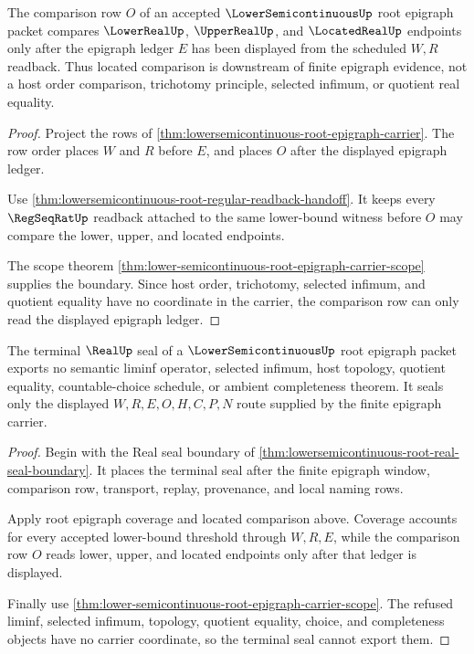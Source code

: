 \begin{theorem}
\label{thm:lowersemicontinuous-root-located-comparison}
The comparison row $O$ of an accepted $\LowerSemicontinuousUp$ root epigraph packet compares $\LowerRealUp$, $\UpperRealUp$, and $\LocatedRealUp$ endpoints only after the epigraph ledger $E$ has been displayed from the scheduled $W,R$ readback. Thus located comparison is downstream of finite epigraph evidence, not a host order comparison, trichotomy principle, selected infimum, or quotient real equality.
\end{theorem}
\begin{proof}
Project the rows of \autoref{thm:lowersemicontinuous-root-epigraph-carrier}. The row order places $W$ and $R$ before $E$, and places $O$ after the displayed epigraph ledger.

Use \autoref{thm:lowersemicontinuous-root-regular-readback-handoff}. It keeps every $\RegSeqRatUp$ readback attached to the same lower-bound witness before $O$ may compare the lower, upper, and located endpoints.

The scope theorem \autoref{thm:lower-semicontinuous-root-epigraph-carrier-scope} supplies the boundary. Since host order, trichotomy, selected infimum, and quotient equality have no coordinate in the carrier, the comparison row can only read the displayed epigraph ledger.
\end{proof}

\begin{theorem}
\label{thm:lowersemicontinuous-root-real-seal-refusal}
The terminal $\RealUp$ seal of a $\LowerSemicontinuousUp$ root epigraph packet exports no semantic liminf operator, selected infimum, host topology, quotient equality, countable-choice schedule, or ambient completeness theorem. It seals only the displayed $W,R,E,O,H,C,P,N$ route supplied by the finite epigraph carrier.
\end{theorem}
\begin{proof}
Begin with the Real seal boundary of \autoref{thm:lowersemicontinuous-root-real-seal-boundary}. It places the terminal seal after the finite epigraph window, comparison row, transport, replay, provenance, and local naming rows.

Apply root epigraph coverage and located comparison above. Coverage accounts for every accepted lower-bound threshold through $W,R,E$, while the comparison row $O$ reads lower, upper, and located endpoints only after that ledger is displayed.

Finally use \autoref{thm:lower-semicontinuous-root-epigraph-carrier-scope}. The refused liminf, selected infimum, topology, quotient equality, choice, and completeness objects have no carrier coordinate, so the terminal seal cannot export them.
\end{proof}

